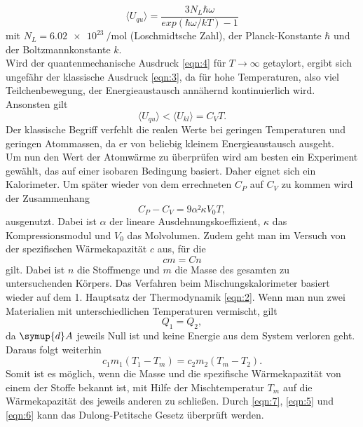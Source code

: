 \begin{equation}
  \langle U_{qu} \rangle = \frac{3N_L\hbar\omega}{exp(\hbar\omega/kT)-1}
  \label{eqn:4}
\end{equation}
mit $N_L = \SI{6,02e23}{\per\mol}$ (Loschmidtsche Zahl), der Planck-Konstante $\hbar$ und der Boltzmannkonstante $k$.\\
Wird der quantenmechanische Ausdruck \ref{eqn:4} für $T\to\infty $ getaylort, ergibt sich ungefähr der klassische Ausdruck \ref{eqn:3}, da für hohe Temperaturen, also viel Teilchenbewegung, der Energieaustausch annähernd kontinuierlich wird.
Ansonsten gilt
\begin{equation}
  \langle U_{qu} \rangle < \langle U_{kl} \rangle = C_VT.
\end{equation}
Der klassische Begriff verfehlt die realen Werte bei geringen Temperaturen und geringen Atommassen, da er von beliebig kleinem Energieaustausch ausgeht.\\
Um nun den Wert der Atomwärme zu überprüfen wird am besten ein Experiment gewählt, das auf einer isobaren Bedingung basiert.
Daher eignet sich ein Kalorimeter.
Um später wieder von dem errechneten $C_P$ auf $C_V$ zu kommen wird der Zusammenhang
\begin{equation}
  C_P - C_V = 9 \alpha² \kappa V_0 T,
  \label{eqn:5}
\end{equation}
ausgenutzt.
Dabei ist $\alpha$ der lineare Ausdehnungskoeffizient, $\kappa$ das Kompressionsmodul und $V_0$ das Molvolumen.
Zudem geht man im Versuch von der spezifischen Wärmekapazität $c$ aus, für die
\begin{equation}
  cm = Cn
  \label{eqn:6}
\end{equation}
gilt.
Dabei ist $n$ die Stoffmenge und $m$ die Masse des gesamten zu untersuchenden Körpers.
Das Verfahren beim Mischungskalorimeter basiert wieder auf dem 1. Hauptsatz der Thermodynamik \ref{eqn:2}.
Wenn man nun zwei Materialien mit unterschiedlichen Temperaturen vermischt, gilt
\begin{equation}
  Q_1 = Q_2,
\end{equation}
da $\symup{d}A$ jeweils Null ist und keine Energie aus dem System verloren geht.
Daraus folgt weiterhin
\begin{equation}
  c_1m_1(T_1-T_m) = c_2m_2(T_m-T_2).
  \label{eqn:7}
\end{equation}
Somit ist es möglich, wenn die Masse und die spezifische Wärmekapazität von einem der Stoffe bekannt ist, mit Hilfe der Mischtemperatur $T_m$ auf die Wärmekapazität des jeweils anderen zu schließen.
Durch \ref{eqn:7}, \ref{eqn:5} und \ref{eqn:6} kann das Dulong-Petitsche Gesetz überprüft werden.


\cite{V201}

